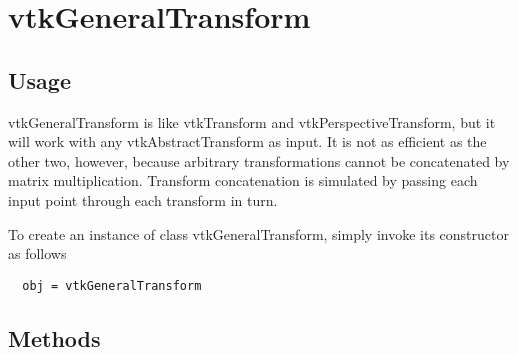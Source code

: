 \section{vtkGeneralTransform}

\subsection{Usage}

 vtkGeneralTransform is like vtkTransform and vtkPerspectiveTransform,
 but it will work with any vtkAbstractTransform as input.  It is
 not as efficient as the other two, however, because arbitrary
 transformations cannot be concatenated by matrix multiplication.
 Transform concatenation is simulated by passing each input point
 through each transform in turn.  

To create an instance of class vtkGeneralTransform, simply
invoke its constructor as follows
\begin{verbatim}
  obj = vtkGeneralTransform
\end{verbatim}
\subsection{Methods}

